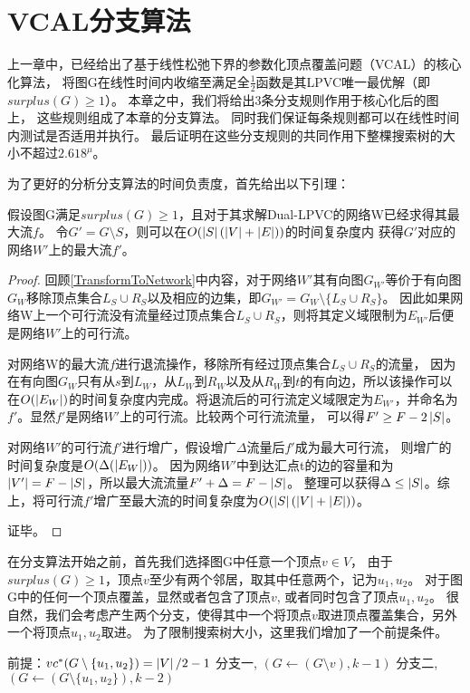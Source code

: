 \section{VCAL分支算法}
上一章中，已经给出了基于线性松弛下界的参数化顶点覆盖问题（VCAL）的核心化算法，
将图G在线性时间内收缩至满足全$\frac{1}{2}$函数是其LPVC唯一最优解（即$surplus(G) \ge 1$）。
本章之中，我们将给出3条分支规则作用于核心化后的图上，
这些规则组成了本章的分支算法。
同时我们保证每条规则都可以在线性时间内测试是否适用并执行。
最后证明在这些分支规则的共同作用下整棵搜索树的大小不超过$2.618^\mu$。

为了更好的分析分支算法的时间负责度，首先给出以下引理：
\begin{lemma}
假设图G满足$surplus(G) \ge 1$，且对于其求解Dual-LPVC的网络W已经求得其最大流$f$。
令$G' = G \setminus S$，则可以在$O(\left\vert S \right\vert(\left\vert V \right\vert + \left\vert E \right\vert))$的时间复杂度内
获得$G'$对应的网络$W'$上的最大流$f'$。
\end{lemma}

\begin{proof}
回顾\ref{TransformToNetwork}中内容，对于网络$W'$其有向图$G_{W'}$等价于有向图$G_W$移除顶点集合$L_S \cup R_S$以及相应的边集，即$G_{W'} = G_W \setminus \{L_S \cup R_S\}$。
因此如果网络W上一个可行流没有流量经过顶点集合$L_S \cup R_S$，则将其定义域限制为$E_{W'}$后便是网络$W'$上的可行流。

对网络W的最大流$f$进行退流操作，移除所有经过顶点集合$L_S \cup R_S$的流量，
因为在有向图$G_W$只有从$s$到$L_W$，从$L_W$到$R_W$以及从$R_W$到$t$的有向边，所以该操作可以在$O(\left\vert E_W \right\vert)$的时间复杂度内完成。将退流后的可行流定义域限定为$E_{W'}$，并命名为$f'$。显然$f'$是网络$W'$上的可行流。比较两个可行流流量，
可以得$F' \ge F - 2 \left\vert S \right\vert$。

对网络$W'$的可行流$f'$进行增广，假设增广$\Delta$流量后$f'$成为最大可行流，
则增广的时间复杂度是$O(\Delta(\left\vert E_W \right\vert))$。
因为网络$W'$中到达汇点t的边的容量和为$\left\vert V' \right\vert = F - \left\vert S \right\vert$，所以最大流流量$F' + \Delta = F - \left\vert S \right\vert$。
整理可以获得$\Delta \le \left\vert S \right\vert$。综上，将可行流$f'$增广至最大流的时间复杂度为$O(\left\vert S \right\vert(\left\vert V \right\vert + \left\vert E \right\vert))$。

证毕。
\end{proof}

在分支算法开始之前，首先我们选择图G中任意一个顶点$v \in V$，
由于$surplus(G) \ge 1$，顶点$v$至少有两个邻居，取其中任意两个，记为$u_1, u_2$。
对于图G中的任何一个顶点覆盖，显然或者包含了顶点$v$, 或者同时包含了顶点$u_1, u_2$。
很自然，我们会考虑产生两个分支，使得其中一个将顶点$v$取进顶点覆盖集合，另外一个将顶点$u_1, u_2$取进。
为了限制搜索树大小，这里我们增加了一个前提条件。

\begin{branchrule}
前提：$vc^*(G \setminus \{u_1, u_2\}) = \left\vert V \right\vert / 2 - 1 $
分支一, $(G \leftarrow (G \setminus v), k - 1)$
分支二, $(G \leftarrow (G \setminus \{u_1, u_2\}), k - 2)$
\end{branchrule}
